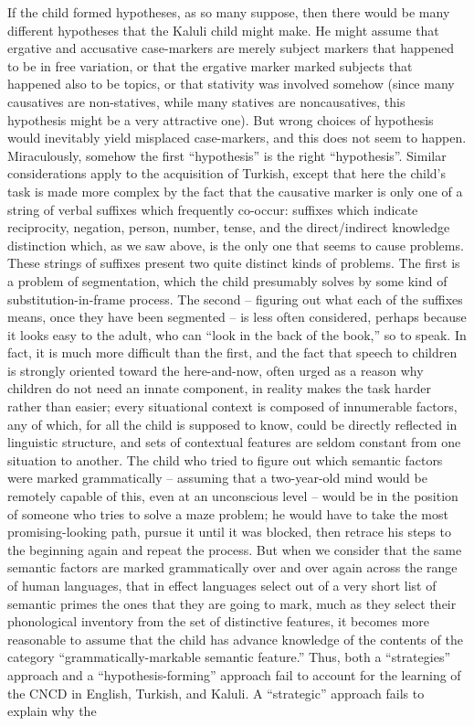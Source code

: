 If the child formed hypotheses, as so many suppose, then there would be many different hypotheses that the Kaluli child might make. He might assume that ergative and accusative case-markers are merely subject markers that happened to be in free variation, or that the ergative marker marked subjects that happened also to be topics, or that stativity was involved somehow (since many causatives are non-statives, while many statives are noncausatives, this hypothesis might be a very attractive one). But wrong choices of hypothesis would inevitably yield misplaced case-markers, and this does not seem to happen. Miraculously, somehow the first ``hypothesis'' is the right ``hypothesis''. Similar considerations apply to the acquisition of Turkish, except
that here the child's task is made more complex by the fact that the causative marker is only one of a string of verbal suffixes which frequently co-occur: suffixes which indicate reciprocity, negation, person, number, tense, and the direct/indirect knowledge distinction which, as we saw above, is the only one that seems to cause problems. These strings of suffixes present two quite distinct kinds of problems. The first is a problem of segmentation, which the child presumably solves by some kind of substitution-in-frame process. The second -- figuring out what each of the suffixes means, once they have been segmented -- is less often considered, perhaps because it looks easy to the adult, who can ``look in the back of the book,'' so to speak. In fact, it is much more difficult than the first, and the fact that speech to children is strongly oriented toward the here-and-now, often urged as a reason why children do not need an innate component, in reality makes the task harder rather than easier; every situational context is composed of innumerable factors, any of which, for all the child is supposed to know, could be directly reflected in linguistic structure, and sets of contextual features are seldom constant from one situation to another. The child who tried to figure out which semantic factors were marked grammatically -- assuming that a two-year-old mind would be remotely capable of this, even at an unconscious level -- would be in the position of someone who tries to solve a maze problem; he would have to take the most promising-looking path, pursue it until it was blocked, then retrace his steps to the beginning again and repeat the process. But when we consider that the same semantic factors are marked grammatically over and over again across the range of human languages, that in effect languages select out of a very short list of semantic primes the ones that they are going to mark, much as they select their phonological inventory from the set of distinctive features, it becomes more reasonable to assume that the child has advance knowledge of the contents of the category ``grammatically-markable semantic feature.'' Thus, both a ``strategies'' approach and a ``hypothesis-forming'' approach fail to account for the learning of the CNCD in English, Turkish, and Kaluli. A ``strategic'' approach fails to explain why the
